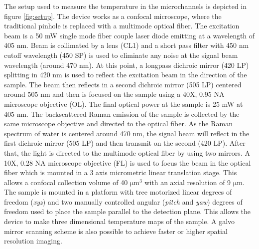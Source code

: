 \documentclass[twocolumn]{svjour3}       %
\begin{document}
The setup used to measure the temperature in the microchannels is depicted in figure \ref{fig:setup}. The device works as a confocal microscope, where the traditional pinhole is replaced with a multimode optical fiber. The excitation beam is a 50 mW single mode fiber couple laser diode emitting at a wavelength of 405 nm. Beam is collimated by a lens (CL1) and a short pass filter with 450 nm cutoff wavelength (450 SP) is used to eliminate any noise at the signal beam wavelength (around 470 nm).
At this point, a longpass dichroic mirror (420 LP) splitting in 420 nm is used to reflect the excitation beam in the direction of the sample. The beam then reflects in a second dichroic mirror (505 LP) centered around 505 nm and then is focused on the sample using a 40X, 0.95 NA microscope objective (OL). The final optical power at the sample is 25 mW at 405 nm. The backscattered Raman emission of the sample is collected by the same microscope objective and directed to the optical fiber. As the Raman spectrum of water is centered around 470 nm, the signal beam will reflect in the first dichroic mirror (505 LP) and then transmit on the second (420 LP). After that, the light is directed to the multimode optical fiber by using two mirrors. A 10X, 0.28 NA microscope objective (FL) is used to focus the beam in the optical fiber which is mounted in a 3 axis micrometric linear translation stage. This allows a confocal collection volume of 40 $\mathrm{\mu m^3}$ with an axial resolution of 9 $\mathrm{\mu m}$. The sample is mounted in a platform with tree motorized linear degrees of freedom (\textit{xyz}) and two manually controlled angular (\textit{pitch} and \textit{yaw}) degrees of freedom used to place the sample parallel to the detection plane. This allows the device to make three dimensional temperature maps of the sample. A galvo mirror scanning scheme is also possible to achieve faster or higher spatial resolution imaging.
\end{document}
